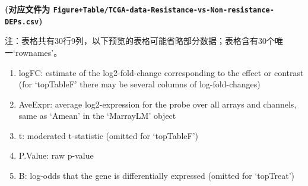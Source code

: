 \documentclass[
]{article}
\providecommand{\tightlist}{%
  \setlength{\itemsep}{0pt}\setlength{\parskip}{0pt}}
\begin{document}
\textbf{(对应文件为 \texttt{Figure+Table/TCGA-data-Resistance-vs-Non-resistance-DEPs.csv})}

\begin{center}\begin{tcolorbox}[colback=gray!10, colframe=gray!50, width=0.9\linewidth, arc=1mm, boxrule=0.5pt]注：表格共有30行9列，以下预览的表格可能省略部分数据；表格含有30个唯一`rownames'。
\end{tcolorbox}
\end{center}
\begin{center}\begin{tcolorbox}[colback=gray!10, colframe=gray!50, width=0.9\linewidth, arc=1mm, boxrule=0.5pt]\begin{enumerate}\tightlist
\item logFC:  estimate of the log2-fold-change corresponding to the effect or contrast (for ‘topTableF’ there may be several columns of log-fold-changes)
\item AveExpr:  average log2-expression for the probe over all arrays and channels, same as ‘Amean’ in the ‘MarrayLM’ object
\item t:  moderated t-statistic (omitted for ‘topTableF’)
\item P.Value:  raw p-value
\item B:  log-odds that the gene is differentially expressed (omitted for ‘topTreat’)
\end{enumerate}\end{tcolorbox}
\end{center}
\end{document}
